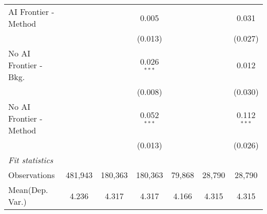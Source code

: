\begin{tabular}{lcccccc}
   AI Frontier - Method    &               &               & 0.005         &               &               & 0.031\\   
                           &               &               & (0.013)       &               &               & (0.027)\\   
   No AI Frontier - Bkg.   &               &               & 0.026$^{***}$ &               &               & 0.012\\   
                           &               &               & (0.008)       &               &               & (0.030)\\   
   No AI Frontier - Method &               &               & 0.052$^{***}$ &               &               & 0.112$^{***}$\\   
                           &               &               & (0.013)       &               &               & (0.026)\\   
   \midrule
   \emph{Fit statistics}\\
   Observations            & 481,943       & 180,363       & 180,363       & 79,868        & 28,790        & 28,790\\  
Mean(Dep. Var.) & 4.236 & 4.317 & 4.317 & 4.166 & 4.315 & 4.315 \\
   

\end{tabular}

